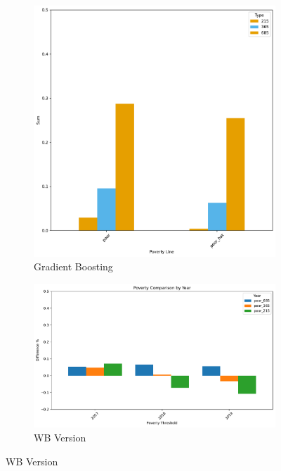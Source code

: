 \begin{figure}[H]
    \caption{Poverty Rate Predicted vs True National}
    \centering
         \centering
         \begin{subfigure}[b]{0.47\textwidth}
            \centering
            \includegraphics[width=\textwidth]{../figures/fig3_prediction_vs_true_poverty_rate_national.pdf}        
            \caption{Gradient Boosting}
         \end{subfigure}
         \hfill
         \begin{subfigure}[b]{0.47\textwidth}
            \centering
            \includegraphics[width=\textwidth]{../figures/baseline_report/fig3_prediction_vs_true_poverty_rate_national.pdf}        
            \caption{WB Version}
         \end{subfigure} 
\end{figure}



